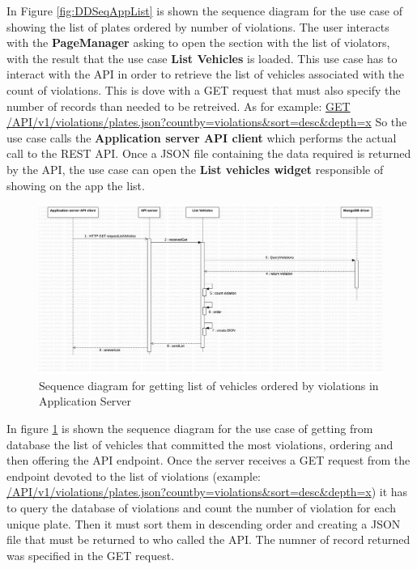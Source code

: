 In Figure \ref{fig:DDSeqAppList} is shown the sequence diagram for the use case of showing the list of plates ordered by number of violations.
The user interacts with the \textbf{PageManager} asking to open the section with the list of violators, with the result that the use case \textbf{List Vehicles} is loaded. This use case has to interact with the API in order to retrieve the list of vehicles associated with the count of violations. This is dove with a GET request that must also specify the number of records than needed to be retreived. As for example: \url{GET} \url{/API/v1/violations/plates.json?countby=violations&sort=desc&depth=x}   So the use case calls the \textbf{Application server API client}  which performs the actual call to the REST API. Once a JSON file containing the data required is returned by the API, the use case can open the \textbf{List vehicles widget} responsible of showing on the app the list.


\begin{figure}[H]
\centering
\includegraphics[width=\textwidth]{Images/DDSeqSeverList.png}
\caption{\label{fig:DDSeqSeverList} Sequence diagram for getting list of vehicles ordered by violations in Application Server  }
\end{figure}
In figure \ref{fig:DDSeqSeverList} is shown the sequence diagram for the use case of getting from database the list of vehicles that committed the most violations, ordering and then offering the API endpoint.
Once the server receives a GET request from the endpoint devoted to the list of violations (example: \url{/API/v1/violations/plates.json?countby=violations&sort=desc&depth=x}) it has to query the database of violations and count the number of violation for each unique plate. Then it must sort them in descending order and creating a JSON file that must be returned to who called the API. The numner of record returned was specified in the GET request.


